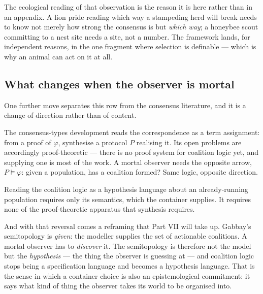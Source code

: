 The ecological reading of that observation is the reason it is here rather than in
an appendix. A lion pride reading which way a stampeding herd will break needs to
know not merely how strong the consensus is but \emph{which way}; a honeybee scout
committing to a nest site needs a site, not a number. The framework lands, for
independent reasons, in the one fragment where selection is definable --- which is
why an animal can act on it at all.

\subsection{What changes when the observer is mortal}

One further move separates this row from the consensus literature, and it is a
change of direction rather than of content.

The consensus-types development reads the correspondence as a term assignment:
from a proof of $\varphi$, synthesise a protocol $P$ realising it. Its open
problems are accordingly proof-theoretic --- there is no proof system for
coalition logic yet, and supplying one is most of the work. A mortal observer
needs the opposite arrow, $P \models \varphi$: given a population, has a coalition
formed? Same logic, opposite direction.

\begin{proposition}
\label{prop:cheap}
Reading the coalition logic as a hypothesis language about an already-running
population requires only its semantics, which the container supplies. It requires
none of the proof-theoretic apparatus that synthesis requires.
\end{proposition}

And with that reversal comes a reframing that Part VII will take up. Gabbay's
semitopology is \emph{given}: the modeller supplies the set of actionable
coalitions. A mortal observer has to \emph{discover} it. The semitopology is
therefore not the model but the \emph{hypothesis} --- the thing the observer is
guessing at --- and coalition logic stops being a specification language and
becomes a hypothesis language. That is the sense in which a container choice is
also an epistemological commitment: it says what kind of thing the observer takes
its world to be organised into.
